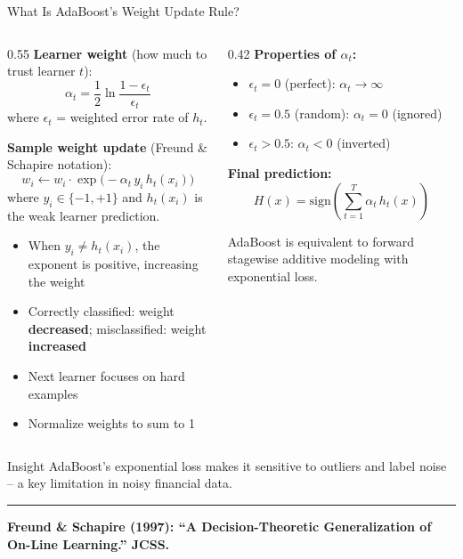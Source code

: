 \documentclass[8pt,aspectratio=169]{beamer}
\newcommand{\bottomnote}[1]{%
\vfill
\vspace{-2mm}
\textcolor{mllavender2}{\rule{\textwidth}{0.4pt}}
\vspace{1mm}
\footnotesize
\textbf{#1}
}
\newenvironment{compactlist}{%
  \begin{itemize}%
    \setlength{\itemsep}{2pt}%
    \setlength{\parskip}{0pt}%
    \setlength{\parsep}{0pt}%
}{%
  \end{itemize}%
}
\newcommand{\highlight}[1]{\textcolor{mlorange}{\textbf{#1}}}
\begin{document}
\begin{frame}{What Is AdaBoost's Weight Update Rule?}
\begin{columns}[T]
\begin{column}{0.55\textwidth}
\small
\textbf{Learner weight} (how much to trust learner $t$):
\[
\alpha_t = \frac{1}{2}\ln\frac{1-\epsilon_t}{\epsilon_t}
\]
where $\epsilon_t$ = weighted error rate of $h_t$.

\vspace{0.3em}
\footnotesize
\textbf{Sample weight update} (Freund \& Schapire notation):
\[
w_i \leftarrow w_i \cdot \exp\!\bigl(-\alpha_t \, y_i \, h_t(x_i)\bigr)
\]
where $y_i \in \{-1, +1\}$ and $h_t(x_i)$ is the weak learner prediction.

\begin{compactlist}
\item When $y_i \neq h_t(x_i)$, the exponent is positive, increasing the weight
\item Correctly classified: weight \highlight{decreased}; misclassified: weight \highlight{increased}
\item Next learner focuses on hard examples
\item Normalize weights to sum to 1
\end{compactlist}
\end{column}
\begin{column}{0.42\textwidth}
\footnotesize
\textbf{Properties of $\alpha_t$:}
\begin{compactlist}
\item $\epsilon_t = 0$ (perfect): $\alpha_t \to \infty$
\item $\epsilon_t = 0.5$ (random): $\alpha_t = 0$ (ignored)
\item $\epsilon_t > 0.5$: $\alpha_t < 0$ (inverted)
\end{compactlist}

\vspace{0.5em}
\textbf{Final prediction:}
\[
H(x) = \text{sign}\!\left(\sum_{t=1}^{T} \alpha_t \, h_t(x)\right)
\]

\vspace{0.3em}
\scriptsize AdaBoost is equivalent to forward stagewise additive modeling with exponential loss.
\end{column}
\end{columns}

\begin{block}{Insight}
\scriptsize AdaBoost's exponential loss makes it sensitive to outliers and label noise -- a key limitation in noisy financial data.
\end{block}
\bottomnote{Freund \& Schapire (1997): ``A Decision-Theoretic Generalization of On-Line Learning.'' JCSS.}
\end{frame}
\end{document}
